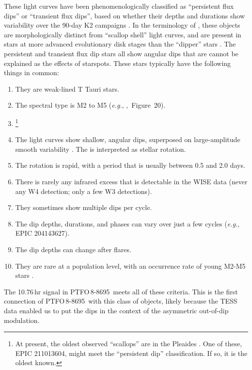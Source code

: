 \documentclass[12pt,twocolumn,tighten]{aastex62}
\newcommand{\ptfo}{PTFO$\,$8-8695}
\begin{document}
These light curves have been phenomenologically classified as
``persistent flux dips'' or ``transient flux dips'', based on whether
their depths and durations show variability over the 90-day K2
campaigns \citep{stauffer_orbiting_2017}.  In the terminology of
\citet{stauffer_orbiting_2017}, these objects are morphologically
distinct from ``scallop shell'' light curves, and are present in stars
at more advanced evolutionary disk stages than the ``dipper'' stars
\citep{ansdell_young_2016,bodman_dippers_2017,cody_manyfaceted_2018}.
The persistent and transient flux dip stars all show angular dips that
are cannot be explained as the effects of starspots.  These stars
typically have the following things in common:
\begin{enumerate}[topsep=0.5ex,itemsep=-0.5ex,partopsep=1ex,parsep=1.5ex]
  \item They are weak-lined T Tauri stars.
  \item The spectral type is M2 to M5 ({\it e.g.},
    \citealt{rebull_usco_2018},~Figure~20).
  \item {}\footnote{ At
    present, the oldest observed ``scallops'' are in the Pleaides
    \citep{rebull_rotation_2016}. One of these, EPIC 211013604, might
    meet the ``persistent dip'' classification.  If so, it is  the
    oldest known. } 
  \item The light curves show shallow, angular dips, 
    superposed on large-amplitude smooth variability . The  is
    interpreted as stellar rotation.
  \item The rotation is rapid, with a period that is usually between
    0.5 and 2.0 days.
  \item There is rarely any infrared excess that is detectable in the
    WISE data (never any W4 detection; only a few W3 detections).
  \item They sometimes show multiple dips per cycle.
  \item The dip depths, durations, and phases can vary over just a few
    cycles ({\it e.g.}, EPIC 204143627).
  \item The dip depths can change after flares.
  \item They are rare at a population level, with an occurrence rate
   of young M2-M5 stars \citep{rebull_usco_2018}.
\end{enumerate}
The 10.76$\,$hr signal in \ptfo\ meets all of these criteria.  This is
the first connection of \ptfo\ with this class of objects, likely
because the TESS data enabled us to put the dips in the context of the
asymmetric out-of-dip modulation.
\end{document}
